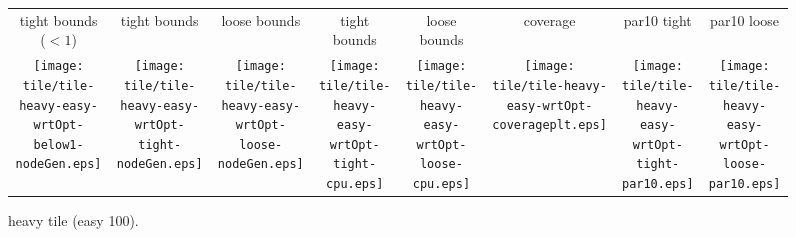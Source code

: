 \documentclass[a4paper,landscape]{article}
\begin{document}
\begin{figure}[t]
	\centering
	\begin{tabular}{c c c c c c c c}
	    tight bounds ($<1$) & tight bounds & loose bounds & tight bounds & loose bounds & coverage & par10 tight & par10 loose\\
	   \begin{minipage}{\cpufigureplotwidth}
        \texttt{[image: tile/tile-heavy-easy-wrtOpt-below1-nodeGen.eps]}
        \end{minipage}&
        \begin{minipage}{\cpufigureplotwidth}
      \texttt{[image: tile/tile-heavy-easy-wrtOpt-tight-nodeGen.eps]}
      \end{minipage}&
        \begin{minipage}{\cpufigureplotwidth}
        \texttt{[image: tile/tile-heavy-easy-wrtOpt-loose-nodeGen.eps]}
        \end{minipage}&
        \begin{minipage}{\cpufigureplotwidth}
        \texttt{[image: tile/tile-heavy-easy-wrtOpt-tight-cpu.eps]}
        \end{minipage}&
        \begin{minipage}{\cpufigureplotwidth}
        \texttt{[image: tile/tile-heavy-easy-wrtOpt-loose-cpu.eps]}
        \end{minipage}&
        \begin{minipage}{\cpufigureplotwidth}
        \texttt{[image: tile/tile-heavy-easy-wrtOpt-coverageplt.eps]}
        \end{minipage}&
        \begin{minipage}{\cpufigureplotwidth}
        \texttt{[image: tile/tile-heavy-easy-wrtOpt-tight-par10.eps]}
        \end{minipage}&
        \begin{minipage}{\cpufigureplotwidth}
        \texttt{[image: tile/tile-heavy-easy-wrtOpt-loose-par10.eps]}
        \end{minipage}
	\end{tabular}
\caption{heavy tile (easy 100).}
\label{fig:tile-heavy-easy}
\end{figure}
\end{document}
